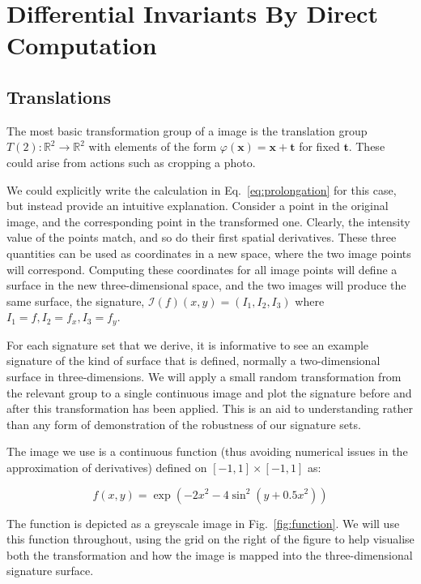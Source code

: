 \documentclass[review,onefignum,onetabnum]{siamonline190516}
\begin{document}
\section{Differential Invariants By Direct Computation}

\subsection{Translations}
\label{sec:T2}

The most basic transformation group of a image is the translation group
$T(2) \colon \mathbb{R}^2 \to \mathbb{R}^2$ with elements of the form
$\varphi(\mathbf{x}) = \mathbf{x} + \mathbf{t}$ for fixed $\mathbf{t}$.
These could arise from actions such as cropping a photo.

We could explicitly write the calculation in Eq.~\ref{eq:prolongation} for
this case, but instead provide an intuitive explanation. Consider a point
in the original image, and the corresponding point in the transformed one.
Clearly, the intensity value of the points match, and so do their first
spatial derivatives. These three quantities can be used as coordinates in a
new space, where the two image points will correspond. Computing these
coordinates for all image points will define a surface in the new
three-dimensional space, and the two images will produce the same surface,
the signature, $\mathcal{I}(f)(x, y) = \left(I_1, I_2,
I_3\right)$ where $I_1 = f, I_2 = f_x, I_3 = f_y$.

For each signature set that we derive, it is informative to see an example signature of the kind of surface that is defined, 
normally a two-dimensional surface in three-dimensions.  We will apply a small random transformation from 
the relevant group to a single continuous image and plot the signature before and after this transformation has been applied.
This is an aid to understanding rather than any form of demonstration of the robustness of our signature sets.

The image we use is a continuous function (thus avoiding numerical issues in the approximation 
of derivatives) defined on $[-1,1] \times [-1,1]$ as:

\begin{equation}\label{eq:function}
f(x, y) = \exp(-2x^2 - 4\sin^2(y + 0.5x^2))
\end{equation}

The function is depicted as a greyscale image in Fig.~\ref{fig:function}.
We will use this function throughout, using the grid on the right of the figure to help visualise both the transformation and how the image
is mapped into the three-dimensional signature surface. 
\end{document}
